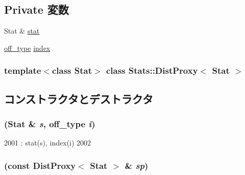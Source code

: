 \subsection*{Private 変数}
\begin{DoxyCompactItemize}
\item 
Stat \& \hyperlink{classStats_1_1DistProxy_a7fee3822515c4dc6b8b99a8bf35fa6b8}{stat}
\item 
\hyperlink{namespaceStats_a2773c9fa9e4b0b04a46b37494b44842a}{off\_\-type} \hyperlink{classStats_1_1DistProxy_a9707c4a1627041aeffc05da26c91acff}{index}
\end{DoxyCompactItemize}
\subsubsection*{template$<$class Stat$>$ class Stats::DistProxy$<$ Stat $>$}



\subsection{コンストラクタとデストラクタ}
\hypertarget{classStats_1_1DistProxy_a839bbf60b388028699273aef0649d7ac}{
\subsubsection[{DistProxy}]{ (Stat \& {\em s}, \/  {\bf off\_\-type} {\em i})}}
\label{classStats_1_1DistProxy_a839bbf60b388028699273aef0649d7ac}



\begin{DoxyCode}
2001         : stat(s), index(i)
2002     {}
\end{DoxyCode}
\hypertarget{classStats_1_1DistProxy_aa288261bae5dd79ea81bce1a034def5b}{
\subsubsection[{DistProxy}]{ (const {\bf DistProxy}$<$ Stat $>$ \& {\em sp})}}
\label{classStats_1_1DistProxy_aa288261bae5dd79ea81bce1a034def5b}



